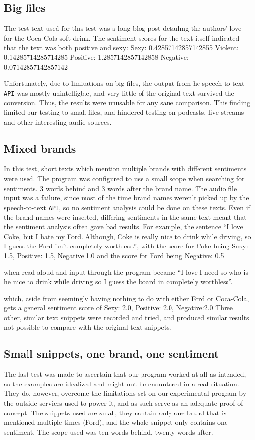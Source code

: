 \documentclass[a4paper,12pt,twoside]{ltxdoc}
\begin{document}
\subsection{Big files}
The test text used for this test was a long blog post detailing the authors' love for the Coca-Cola soft drink. The sentiment scores for the text itself indicated that the text was both positive and sexy:
Sexy: 0.42857142857142855 Violent: 0.14285714285714285 Positive: 1.2857142857142858 Negative: 0.07142857142857142


Unfortunately, due to limitations on big files, the output from he speech-to-text \verb#API# was mostly unintelligble, and very little of the original text survived the conversion. Thus, the results were unusable for any sane comparison. This finding limited our testing to small files, and hindered testing on podcasts, live streams and other interesting audio sources.

\subsection{Mixed brands}
In this test, short texts which mention multiple brands with different sentiments were used. The program was configured to use a small scope when searching for sentiments, 3 words behind and 3 words after the brand name. The audio file input was a failure, since most of the time brand names weren't picked up by the speech-to-text \verb#API#, so no sentiment analysis could be done on these texts. Even if the brand names were inserted, differing sentiments in the same text meant that the sentiment analysis often gave bad results. For example, the sentence ``I love Coke, but I hate my Ford. Although, Coke is really nice to drink while driving, so I guess the Ford isn't completely worthless.'', with the score for Coke being 
Sexy: 1.5, Positive: 1.5, Negative:1.0
and the score for Ford being
Negative: 0.5

when read aloud and input through the program became ``I love I need so who is he nice to drink while driving so I guess the board in completely worthless''.

which, aside from seemingly having nothing to do with either Ford or Coca-Cola, gets a general sentiment score of 
Sexy: 2.0, Positive: 2.0, Negative:2.0
Three other, similar text snippets were recorded and tried, and produced similar results not possible to compare with the original text snippets.

\subsection{Small snippets, one brand, one sentiment}
The last test was made to ascertain that our program worked at all as intended, as the examples are idealized and might not be enountered in a real situation. They do, however, overcome the limitations set on our experimental program by the outside services used to power it, and as such serve as an adequate proof of concept. The snippets used are small, they contain only one brand that is mentioned multiple times (Ford), and the whole snippet only contains one sentiment. The scope used was ten words behind, twenty words after.
\end{document}
